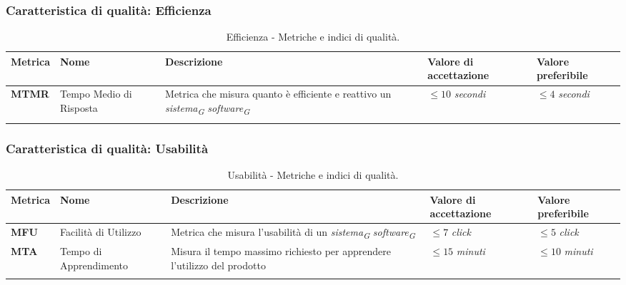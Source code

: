 \subsubsection{Caratteristica di qualità: Efficienza}
\hspace{1pt}
        \begin{longtable}{|C{1.5cm}|L{3cm}|L{4cm}|L{2.5cm}|L{2.5cm}|}
                    \hline
                    \textbf{Metrica} & \textbf{Nome} & \textbf{Descrizione} & \textbf{Valore di accettazione} & \textbf{Valore preferibile} \\
                    \hline
                    \textbf{MTMR} & Tempo Medio di Risposta & Metrica che misura quanto è efficiente e reattivo un \textit{sistema}\textsubscript{\textit{G}} \textit{software}\textsubscript{\textit{G}} & $\leq 10$ \textit{secondi}  & $\leq 4$ \textit{secondi}\\
                    \hline
                    \caption{Efficienza - Metriche e indici di qualità.}
        \label{tab:metriche_efficienza_testo}
    \end{longtable}

\subsubsection{Caratteristica di qualità: Usabilità}
\hspace{1pt}
            \begin{longtable}{|C{1.5cm}|L{3cm}|L{4cm}|L{2.5cm}|L{2.5cm}|}
                        \hline
                        \textbf{Metrica} & \textbf{Nome} & \textbf{Descrizione} & \textbf{Valore di accettazione} & \textbf{Valore preferibile} \\
                        \hline
                        \textbf{MFU} & Facilità di Utilizzo & Metrica che misura l'usabilità di un \textit{sistema}\textsubscript{\textit{G}} \textit{software}\textsubscript{\textit{G}} & $\leq 7$ \textit{click}  & $\leq 5$ \textit{click}\\
                        \hline
                        \textbf{MTA} & Tempo di Apprendimento & Misura il tempo massimo richiesto per apprendere l'utilizzo del prodotto & $\leq 15$ \textit{minuti}  & $\leq 10$ \textit{minuti}\\
                        \hline
                        \caption{Usabilità - Metriche e indici di qualità.}
            \label{tab:metriche_usabilità_testo}
        \end{longtable}

